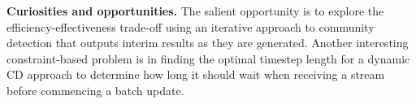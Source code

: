 \textbf{Curiosities and opportunities.} 
The salient opportunity is to explore the efficiency-effectiveness trade-off using an iterative approach to community detection that outputs interim results as they are generated. 
Another interesting constraint-based problem is in finding the optimal timestep length for a dynamic \ac{CD} approach to determine how long it should wait when receiving a stream before commencing a batch update. 